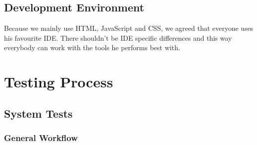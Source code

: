 \documentclass[twoside,12pt,a4paper]{article}
\begin{document}
\subsection{Development Environment}
Because we mainly use HTML, JavaScript and CSS, we agreed that everyone uses his favourite IDE. There shouldn't be IDE specific differences and this way everybody can work with the tools he performs best with.

\newpage

\section{Testing Process} %
\label{sec:testing_process}

\subsection{System Tests}
\subsubsection{General Workflow} %
\label{sub:general_workflow}
\end{document}
